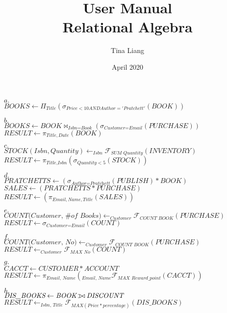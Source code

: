 \documentclass{article}
\title{
  User Manual\\
  \large{Relational Algebra}
}
\author{Tina Liang}
\date{April 2020}
\def\ojoin{\setbox0=\hbox{$\bowtie$}%
  \rule[-.02ex]{.25em}{.4pt}\llap{\rule[\ht0]{.25em}{.4pt}}}
\def\leftouterjoin{\mathbin{\ojoin\mkern-5.8mu\bowtie}}
\begin{document}
$a.$\\
$BOOKS \leftarrow \Pi_{Title}(\sigma_{Price<10 AND Author = 'Pratchett'}(BOOK))$
\hfill \break

$b.$\\
$\textit{BOOKS} \leftarrow \textit{BOOK} \bowtie_{\textit{Isbn} = \textit{Book}} (\sigma_{\textit{Customer}=\textit{Email}}(\textit{PURCHASE}))$\\
$\textit{RESULT} \leftarrow \pi_{Title, Date} (\textit{BOOK})$
\hfill \break

$c.$\\
${STOCK(Isbn, Quantity)} \leftarrow _{\textit{Isbn}}\mathcal{F}_{\textit{SUM Quantity}}(\textit{INVENTORY})$\\
$\textit{RESULT} \leftarrow \pi_{\textit{Title}, \textit{Isbn}}(\sigma_{\textit{Quantity} < 5}(STOCK))$
\hfill \break

$d.$\\
$\textit{PRATCHETTS} \leftarrow (\sigma_{\textit{Author} = \textit{Pratchett}}(\textit{PUBLISH}) * \textit{BOOK})$\\
$\textit{SALES} \leftarrow (\textit{PRATCHETTS} * \textit{PURCHASE})$\\
$\textit{RESULT} \leftarrow (\pi_{\textit{Email}, \textit{Name}, \textit{Title}}(\textit{SALES}))$
\hfill \break

$e.$\\
$\textit{COUNT(Customer, \# of Books)} \leftarrow _{\textit{Customer}}\mathcal{F}_{\textit{COUNT BOOK}}(\textit{PURCHASE})$\\
$\textit{RESULT} \leftarrow \sigma_{\textit{Customer} = \textit{Email}}(\textit{COUNT})$
\hfill \break

$f.$\\
$\textit{COUNT(Customer, No)} \leftarrow _{\textit{Customer}}\mathcal{F}_{\textit{COUNT BOOK}}(\textit{PURCHASE})$\\
$\textit{RESULT} \leftarrow _{\textit{Customer}}\mathcal{F}_{\textit{MAX No}}(\textit{COUNT})$
\hfill \break

$g.$\\
$\textit{CACCT} \leftarrow \textit{CUSTOMER} * \textit{ACCOUNT}$\\
$\textit{RESULT} \leftarrow \pi_{\textit{Email, Name}}(_{\textit{Email, Name}}\mathcal{F}_{\textit{MAX Reward\_point}}(\textit{CACCT}))$
\hfill \break

$h.$\\
$\textit{DIS\_BOOKS} \leftarrow \textit{BOOK} \leftouterjoin \textit{DISCOUNT}$\\
$\textit{RESULT} \leftarrow _{\textit{Isbn, Title}}\mathcal{F}_{\textit{MAX} (\textit{Price} * \textit{percentage})}(\textit{DIS\_BOOKS})$
\hfill \break
\end{document}
